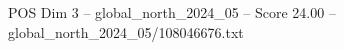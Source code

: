 \begin{textsample}{POS Dim 3 – global\_north\_2024\_05 – Score 24.00 – global\_north\_2024\_05/108046676.txt}
\end{textsample}
